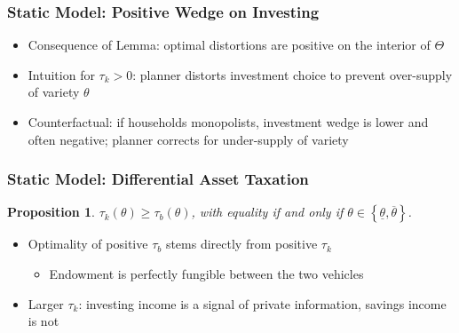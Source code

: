 \documentclass{beamer}
\newtheorem{proposition}{Proposition}
\begin{document}
\begin{frame}
    \frametitle{Static Model: Positive Wedge on Investing}

    \begin{itemize}
        \item Consequence of Lemma: optimal distortions are positive on the interior of \( \Theta \)
        \item Intuition for \( \tau_k>0 \): planner distorts investment choice to prevent over-supply of variety \( \theta \) 
        \item Counterfactual: if households monopolists, investment wedge is lower and often negative; planner corrects for under-supply of variety 
    \end{itemize}

\end{frame}

\begin{frame}
    \frametitle{Static Model: Differential Asset Taxation}

    \begin{proposition} \label{prop:tauk_bigger}
        \( \tau_{k}\left(\theta\right)\ge\tau_{b}\left(\theta\right) \), with equality if and only if \( \theta\in\left\{ \underline{\theta},\overline{\theta}\right\}  \).
    \end{proposition}
    \begin{itemize}
        \item Optimality of positive \( \tau_b \) stems directly from positive \( \tau_k \) 
        \begin{itemize}
            \item Endowment is perfectly fungible between the two vehicles
        \end{itemize}
        \item Larger \( \tau_k \): investing income is a signal of private information, savings income is not
    \end{itemize}
\end{frame}
\end{document}
